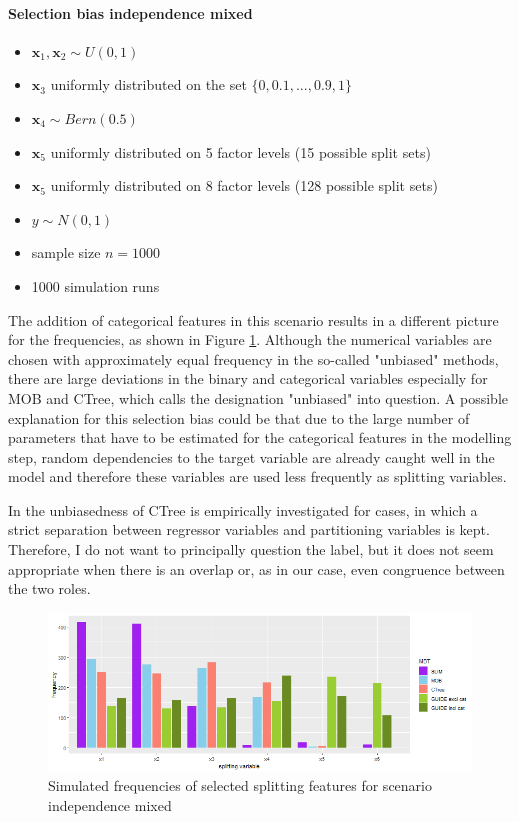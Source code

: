 \paragraph{Selection bias independence mixed}
\begin{itemize}
    \item $\textbf{x}_{1}, \textbf{x}_{2} \sim U(0,1)$ 
    \item $\textbf{x}_3$ uniformly distributed on the set $\{0, 0.1,..., 0.9, 1\}$ 
    \item $\textbf{x}_4  \sim Bern(0.5)$ 
    \item $\textbf{x}_5$ uniformly distributed on 5 factor levels (15 possible split sets) 
    \item $\textbf{x}_5$ uniformly distributed on 8 factor levels (128 possible split sets) %
    \item $y \sim N(0,1)$
    \item sample size $n = 1000$
    \item 1000 simulation runs
\end{itemize}

The addition of categorical features in this scenario results in a different picture for the frequencies, as shown in Figure \ref{fig:selection_bias_independence_mixed}. Although the numerical variables are chosen with approximately equal frequency in the so-called "unbiased" methods, there are large deviations in the binary and categorical variables especially for MOB and CTree, which calls the designation "unbiased" into question. 
A possible explanation for this selection bias could be that due to the large number of parameters that have to be estimated for the categorical features in the modelling step, random dependencies to the target variable are already caught well in the model  and therefore these variables are used less frequently as splitting variables.


In \citep{Hothorn.2006} the unbiasedness of CTree is empirically investigated for cases, in which a strict separation between regressor variables and partitioning variables is kept. Therefore, I do not want to principally question the label, but it does not seem appropriate when there is an overlap or, as in our case, even congruence between the two roles.


\begin{figure}[!htb]
    \centering
    \includegraphics[width=16cm]{Figures/simulations/batchtools/selection_bias_general/independence_mixed.png}
    \caption{Simulated frequencies of selected splitting features for scenario independence mixed}
    \label{fig:selection_bias_independence_mixed}
\end{figure}

